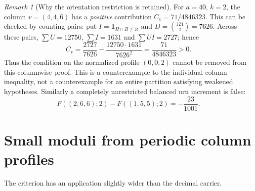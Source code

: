 \documentclass[11pt,a4paper]{article}
\theoremstyle{remark}
\newtheorem{remark}[theorem]{Remark}
\numberwithin{equation}{section}
\begin{document}
\begin{remark}[Why the orientation restriction is retained]\label{rem:obstruction}
For \(a=40\), \(k=2\), the column \(v=(4,4,6)\) has a
\emph{positive} contribution \(C_v=71/4846323\).
This can be checked by counting pairs: put
\(I=\mathbf1_{H\cap B\ne\varnothing}\) and \(D=\binom{124}{2}=7626\).
Across these pairs, \(\sum U=12750\), \(\sum I=1631\) and
\(\sum UI=2727\); hence
\[
 C_v=\frac{2727}{7626}
     -\frac{12750\cdot1631}{7626^2}
     =\frac{71}{4846323}>0.
\]
Thus the condition on the normalized profile \((0,0,2)\) cannot be
removed from this columnwise proof. This is a counterexample to
the individual-column inequality, not a counterexample for an
entire partition satisfying weakened hypotheses.
Similarly a completely unrestricted balanced urn increment is false:
\[
 F((2,6,6);2)-F((1,5,5);2)=-\frac{23}{1001}.
\]
\end{remark}

\section{Small moduli from periodic column profiles}\label{sec:small}
The criterion has an application slightly wider than the decimal carrier.
\end{document}
